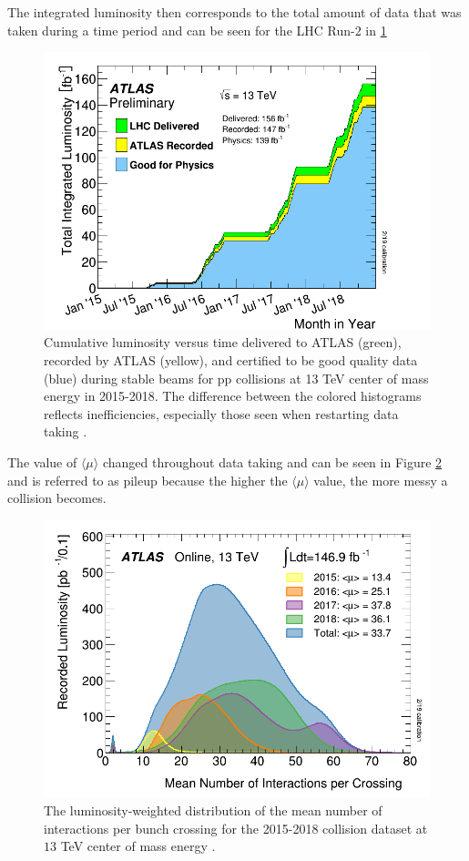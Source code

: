 		The integrated luminosity then corresponds to the total amount of data that was taken during a time period and can be seen for the LHC Run-2 in \ref{fig:lhc-lumi}
		\begin{figure}[!ht]
		\centering
		\includegraphics[width=.65\textwidth,keepaspectratio=true]{chapters/chapter3_experiment/images/intlumivstimeRun2DQall.png}
		\caption{ Cumulative luminosity versus time delivered to \gls{ATLAS} (green), recorded by \gls{ATLAS} (yellow), and certified to be good quality data (blue) during stable beams for pp collisions at 13 TeV center of mass energy in 2015-2018. The difference between the colored histograms reflects inefficiencies, especially those seen when restarting data taking \cite{luminositypublicresultsrun2}.}
		\label{fig:lhc-lumi}
		\end{figure}
		The value of $\langle \mu \rangle$ changed throughout data taking and can be seen in Figure \ref{fig:run2-mu} and is referred to as pileup because the higher the $\langle \mu \rangle$ value, the more messy a collision becomes.
		\begin{figure}[!ht]
		\centering
		\includegraphics[width=.65\textwidth,keepaspectratio=true]{chapters/chapter3_experiment/images/mu_2015_2018.png}
		\caption{ The luminosity-weighted distribution of the mean number of interactions per bunch crossing for the 2015-2018 \pp collision dataset at $13$ TeV center of mass energy \cite{luminositypublicresultsrun2}.}
		\label{fig:run2-mu}
		\end{figure}
